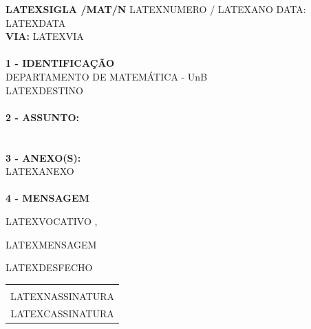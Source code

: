 \documentclass[12pt]{artigo_novo}
\begin{document}
\vspace*{.8cm}
\timbrado
\parindent=2cm 
\setlength{\baselineskip}{5mm}
\noindent 
\begin{minipage}{16cm}
\vspace*{-12mm}
\parindent=2cm
\setlength{\baselineskip}{5mm}
\vspace*{.2cm}
\noindent
\small
{\bf  LATEXSIGLA /MAT/N\primo} LATEXNUMERO / LATEXANO \hfill {DATA:} {LATEXDATA}
\vum \\
{\bf VIA:} {LATEXVIA}  
\\
\mbox{} \hrulefill
\\
{\bf 1 - IDENTIFICA\c{C}\~AO} 
\\
\phantom{xxx}{\bf Proced\^encia:} {DEPARTAMENTO DE MATEM\'ATICA - UnB}
\\
 {LATEXDESTINO }
\\
\mbox{} \hrulefill
\\
{\bf 2 - ASSUNTO:} 
\\
\phantom{xxx}{LATEXASSUNTO }
\\
\mbox{} \hrulefill
\\
{\bf 3 - ANEXO(S):} 
\\
\phantom{xxx} {LATEXANEXO }
\\
\mbox{} \hrulefill
\\
{ \bf 4 - MENSAGEM} 
\end{minipage}
\setlength{\baselineskip}{9mm}

\vspace*{1.5cm} 
LATEXVOCATIVO ,
\vspace*{10mm} 

LATEXMENSAGEM
\vspace*{1.0cm} 

LATEXDESFECHO 
\vspace*{1.0cm} 
\hspace*{5.5cm}
\setlength{\baselineskip}{4mm}
\begin{center}
\begin{tabular}{c}
\hline \vspace*{-3mm}\\
LATEXNASSINATURA \\
{\small LATEXCASSINATURA}
\end{tabular}
\end{center}
\end{document}
